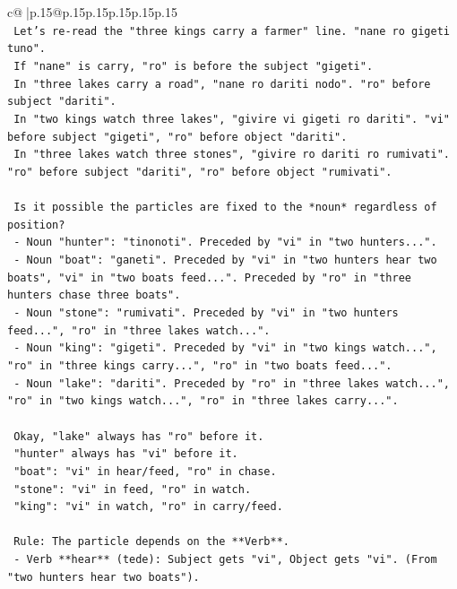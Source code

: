 \documentclass{article}
\begin{document}
{\begin{supertabular}{c@{$\;$}|p{.15\linewidth}@{}p{.15\linewidth}p{.15\linewidth}p{.15\linewidth}p{.15\linewidth}p{.15\linewidth}}
{{{\\ 
\texttt{    Let's re{-}read the "three kings carry a farmer" line. "nane ro gigeti tuno".} \\
\texttt{    If "nane" is carry, "ro" is before the subject "gigeti".} \\
\texttt{    In "three lakes carry a road", "nane ro dariti nodo". "ro" before subject "dariti".} \\
\texttt{    In "two kings watch three lakes", "givire vi gigeti ro dariti". "vi" before subject "gigeti", "ro" before object "dariti".} \\
\texttt{    In "three lakes watch three stones", "givire ro dariti ro rumivati". "ro" before subject "dariti", "ro" before object "rumivati".} \\
\\ 
\texttt{    Is it possible the particles are fixed to the *noun* regardless of position?} \\
\texttt{    {-} Noun "hunter": "tinonoti". Preceded by "vi" in "two hunters...".} \\
\texttt{    {-} Noun "boat": "ganeti". Preceded by "vi" in "two hunters hear two boats", "vi" in "two boats feed...". Preceded by "ro" in "three hunters chase three boats".} \\
\texttt{    {-} Noun "stone": "rumivati". Preceded by "vi" in "two hunters feed...", "ro" in "three lakes watch...".} \\
\texttt{    {-} Noun "king": "gigeti". Preceded by "vi" in "two kings watch...", "ro" in "three kings carry...", "ro" in "two boats feed...".} \\
\texttt{    {-} Noun "lake": "dariti". Preceded by "ro" in "three lakes watch...", "ro" in "two kings watch...", "ro" in "three lakes carry...".} \\
\\ 
\texttt{    Okay, "lake" always has "ro" before it.} \\
\texttt{    "hunter" always has "vi" before it.} \\
\texttt{    "boat": "vi" in hear/feed, "ro" in chase.} \\
\texttt{    "stone": "vi" in feed, "ro" in watch.} \\
\texttt{    "king": "vi" in watch, "ro" in carry/feed.} \\
\\ 
\texttt{    Rule: The particle depends on the **Verb**.} \\
\texttt{    {-} Verb **hear** (tede): Subject gets "vi", Object gets "vi". (From "two hunters hear two boats").} \\
}}}
\end{supertabular}}
\end{document}

